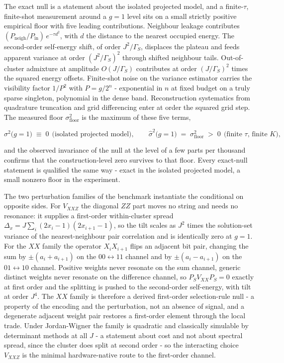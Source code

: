 The exact null is a statement about the isolated projected model, and a finite-$\tau$, finite-shot measurement around a $g = 1$ level sits on a small strictly positive empirical floor with five leading contributions. Neighbour leakage contributes $(P_{\mathrm{neigh}}/P_{\mathrm{in}})\, e^{-\tau d^2}$, with $d$ the distance to the nearest occupied energy. The second-order self-energy shift, of order $J^2/\Gamma_S$, displaces the plateau and feeds apparent variance at order $(J^2/\Gamma_S)^2$ through shifted neighbour tails. Out-of-cluster admixture at amplitude $O(J/\Gamma_S)$ contributes at order $(J/\Gamma_S)^2$ times the squared energy offsets. Finite-shot noise on the variance estimator carries the visibility factor $1/P^2$ with $P = g/2^n$ - exponential in $n$ at fixed budget on a truly sparse singleton, polynomial in the dense band. Reconstruction systematics from quadrature truncation and grid differencing enter at order the squared grid step. The measured floor $\sigma^2_{\mathrm{floor}}$ is the maximum of these five terms,
\begin{widetext}
\[
\sigma^2\bigl(g{=}1\bigr) \;\equiv\; 0 \ \ \text{(isolated projected model)}, \qquad \hat\sigma^2\bigl(g{=}1\bigr) \;=\; \sigma^2_{\mathrm{floor}} \;>\; 0 \ \ \text{(finite $\tau$, finite $K$)},
\]
\end{widetext}
and the observed invariance of the null at the level of a few parts per thousand confirms that the construction-level zero survives to that floor. Every exact-null statement is qualified the same way - exact in the isolated projected model, a small nonzero floor in the experiment.

The two perturbation families of the benchmark instantiate the conditional on opposite sides. For $V_{XXZ}$ the diagonal $ZZ$ part moves no string and needs no resonance: it supplies a first-order within-cluster spread $\Delta_x = J \sum_i (2x_i - 1)(2x_{i+1} - 1)$, so the tilt scales as $J^2$ times the solution-set variance of the nearest-neighbour pair correlation and is identically zero at $g = 1$. For the $XX$ family the operator $X_i X_{i+1}$ flips an adjacent bit pair, changing the sum by $\pm(a_i + a_{i+1})$ on the $00 \leftrightarrow 11$ channel and by $\pm(a_i - a_{i+1})$ on the $01 \leftrightarrow 10$ channel. Positive weights never resonate on the sum channel, generic distinct weights never resonate on the difference channel, so $P_S V_{XX} P_S = 0$ exactly at first order and the splitting is pushed to the second-order self-energy, with tilt at order $J^4$. The $XX$ family is therefore a derived first-order selection-rule null - a property of the encoding and the perturbation, not an absence of signal, and a degenerate adjacent weight pair restores a first-order element through the local trade. Under Jordan-Wigner the family is quadratic and classically simulable by determinant methods at all $J$ \cite{valiant2002matchgates,terhal2002fermions,jozsa2008matchgates} - a statement about cost and not about spectral spread, since the cluster does split at second order - so the interacting choice $V_{XXZ}$ is the minimal hardware-native route to the first-order channel.

